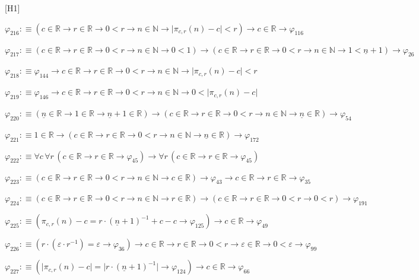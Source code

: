 \begin{fullproof}{[H1]}
\begin{abbrevlist}
\item $\varphi_{216} :\equiv (c \in \mathbb{R} \to r \in \mathbb{R} \to 0 < r \to n \in \mathbb{N} \to \lvert \pi_{c,r}(n) - c \rvert < r) \to c \in \mathbb{R} \to \varphi_{116}$
\item $\varphi_{217} :\equiv (c \in \mathbb{R} \to r \in \mathbb{R} \to 0 < r \to n \in \mathbb{N} \to 0 < 1) \to (c \in \mathbb{R} \to r \in \mathbb{R} \to 0 < r \to n \in \mathbb{N} \to 1 < \underline{n} + 1) \to \varphi_{26}$
\item $\varphi_{218} :\equiv \varphi_{144} \to c \in \mathbb{R} \to r \in \mathbb{R} \to 0 < r \to n \in \mathbb{N} \to \lvert \pi_{c,r}(n) - c \rvert < r$
\item $\varphi_{219} :\equiv \varphi_{146} \to c \in \mathbb{R} \to r \in \mathbb{R} \to 0 < r \to n \in \mathbb{N} \to 0 < \lvert \pi_{c,r}(n) - c \rvert$
\item $\varphi_{220} :\equiv (\underline{n} \in \mathbb{R} \to 1 \in \mathbb{R} \to \underline{n} + 1 \in \mathbb{R}) \to (c \in \mathbb{R} \to r \in \mathbb{R} \to 0 < r \to n \in \mathbb{N} \to \underline{n} \in \mathbb{R}) \to \varphi_{54}$
\item $\varphi_{221} :\equiv 1 \in \mathbb{R} \to (c \in \mathbb{R} \to r \in \mathbb{R} \to 0 < r \to n \in \mathbb{N} \to \underline{n} \in \mathbb{R}) \to \varphi_{172}$
\item $\varphi_{222} :\equiv \forall c\,\forall r\,(c \in \mathbb{R} \to r \in \mathbb{R} \to \varphi_{45}) \to \forall r\,(c \in \mathbb{R} \to r \in \mathbb{R} \to \varphi_{45})$
\item $\varphi_{223} :\equiv (c \in \mathbb{R} \to r \in \mathbb{R} \to 0 < r \to n \in \mathbb{N} \to c \in \mathbb{R}) \to \varphi_{43} \to c \in \mathbb{R} \to r \in \mathbb{R} \to \varphi_{35}$
\item $\varphi_{224} :\equiv (c \in \mathbb{R} \to r \in \mathbb{R} \to 0 < r \to n \in \mathbb{N} \to r \in \mathbb{R}) \to (c \in \mathbb{R} \to r \in \mathbb{R} \to 0 < r \to 0 < r) \to \varphi_{191}$
\item $\varphi_{225} :\equiv (\pi_{c,r}(n) - c = r \cdot (\underline{n} + 1)^{-1} + c - c \to \varphi_{125}) \to c \in \mathbb{R} \to \varphi_{49}$
\item $\varphi_{226} :\equiv (r \cdot (\varepsilon \cdot r^{-1}) = \varepsilon \to \varphi_{36}) \to c \in \mathbb{R} \to r \in \mathbb{R} \to 0 < r \to \varepsilon \in \mathbb{R} \to 0 < \varepsilon \to \varphi_{99}$
\item $\varphi_{227} :\equiv (\lvert \pi_{c,r}(n) - c \rvert = \lvert r \cdot (\underline{n} + 1)^{-1} \rvert \to \varphi_{124}) \to c \in \mathbb{R} \to \varphi_{66}$

\end{abbrevlist}
\end{fullproof}
